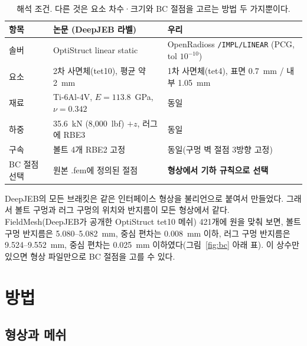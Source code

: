 \documentclass[11pt]{article}
\begin{document}
\begin{table}[h]
\centering\small
\begin{tabular}{@{}lll@{}}
\toprule
항목 & 논문 (DeepJEB 라벨) & 우리 \\
\midrule
솔버 & OptiStruct linear static & OpenRadioss \texttt{/IMPL/LINEAR} (PCG, tol $10^{-10}$) \\
요소 & 2차 사면체(tet10), 평균 약 2~mm & 1차 사면체(tet4), 표면 0.7~mm / 내부 1.05~mm \\
재료 & Ti-6Al-4V, $E=113.8$~GPa, $\nu=0.342$ & 동일 \\
하중 & 35.6~kN (8,000~lbf) $+z$, 러그에 RBE3 & 동일 \\
구속 & 볼트 4개 RBE2 고정 & 동일(구멍 벽 절점 3방향 고정) \\
BC 절점 선택 & 원본 .fem에 정의된 절점 & \textbf{형상에서 기하 규칙으로 선택} \\
\bottomrule
\end{tabular}
\caption{해석 조건. 다른 것은 요소 차수·크기와 BC 절점을 고르는 방법 두 가지뿐이다.}
\label{tab:setup}
\end{table}

DeepJEB의 모든 브래킷은 같은 인터페이스 형상을 불리언으로 붙여서 만들었다.
그래서 볼트 구멍과 러그 구멍의 위치와 반지름이 모든 형상에서 같다.
FieldMesh(DeepJEB가 공개한 OptiStruct tet10 메쉬) 421개에 원을 맞춰 보면,
볼트 구멍 반지름은 5.080--5.082~mm, 중심 편차는 0.008~mm 이하, 러그 구멍
반지름은 9.524--9.552~mm, 중심 편차는 0.025~mm 이하였다(그림~\ref{fig:bc} 아래 표). 이 상수만 있으면
형상 파일만으로 BC 절점을 고를 수 있다.

\section{방법}

\subsection{형상과 메쉬}
\end{document}

